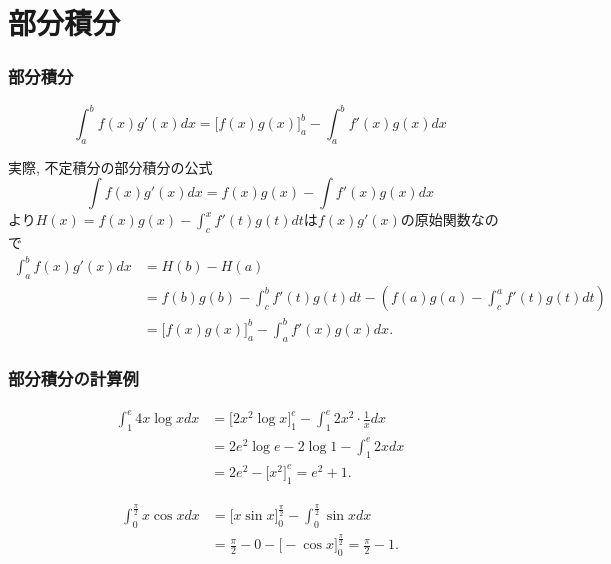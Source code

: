

\section{部分積分}

\begin{frame}
\frametitle{部分積分}

\vspace{-2.7mm}

\begin{Thm}[部分積分の公式] \vspace{-1mm}
$$
\int_a^b f(x)g'(x)dx = \big[f(x)g(x)\big]_a^b - \int_a^b f'(x)g(x)dx
$$
\end{Thm} \vspace{-0.5mm}
実際, 不定積分の部分積分の公式
$$
\int f(x)g'(x)dx = f(x)g(x) - \int f'(x)g(x)dx
$$
より$H(x)=f(x)g(x) - \int_c^x f'(t)g(t)dt$は$ f(x)g'(x)$の原始関数なので \vspace{-1mm}
\begin{align*}
\int_a^b f(x)g'(x)dx &= H(b)-H(a) \\
& = f(b)g(b) - \int_c^b f'(t)g(t)dt - (f(a)g(a) - \int_c^a f'(t)g(t)dt) \\
& = \big[f(x)g(x)\big]_a^b - \int_a^b f'(x)g(x)dx. 
\end{align*}


\end{frame}



\begin{frame}
\frametitle{部分積分の計算例}


\begin{align*}
\int_1^{e} 4 x \log x dx & = \big[ 2x^2 \log x \big]_1^{e}- \int_1^e 2x^2 \cdot \frac{1}{x}dx \\
& = 2e^2 \log e - 2 \log 1 - \int_1^e2xdx \\
& = 2e^2-\big[x^2\big]_1^e = e^2+1. 
\end{align*}

\begin{align*}
\int_0^{\frac{\pi}{2}} x \cos x  dx & = \big[ x \sin x \big]_0^{\frac{\pi}{2}} - \int_0^{\frac{\pi}{2}} \sin x dx \\
& = \frac{\pi}{2}-0-\big[-\cos x \big]_0^{\frac{\pi}{2}}= \frac{\pi}{2}-1. 
\end{align*}

\end{frame}


